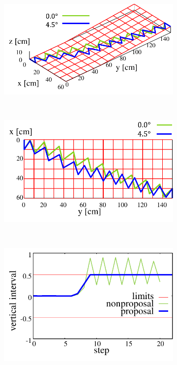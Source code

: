 \documentclass[autodetect-engine,dvipdfmx-if-dvi,ja=standard,a4j,jbase=11pt,magstyle=nomag*]{bxjsreport}
\begin{document}
\begin{figure}[pt]%
    \centering
    \begin{subfigure}[c]{0.7\linewidth}
        \centering%
        \includegraphics[width=\linewidth, clip]{./figure/sim_nao_slope_45_xyz.pdf}%
        \label{fig:sim_nao_slope_45_xyz}%
    \end{subfigure}\\ %
    \begin{subfigure}[c]{0.6\linewidth}
        \centering%
        \includegraphics[width=\linewidth, clip]{./figure/sim_nao_slope_45_xy.pdf}%
        \label{fig:sim_nao_slope_45_xy}%
    \end{subfigure}\\ %
    \begin{subfigure}[c]{0.5\linewidth}
        \centering%
        \includegraphics[width=\linewidth, clip]{./figure/sim_nao_slope_45_zdiff.pdf}%

\end{subfigure}
\end{figure}
\end{document}
